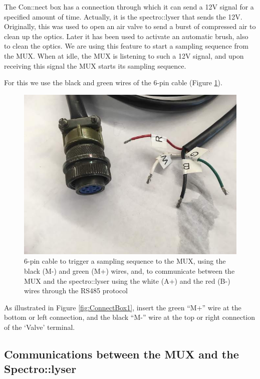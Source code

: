 \documentclass[]{book}
\begin{document}
The Con::nect box has a connection through which it can send a 12V signal for a specified amount of time. Actually, it is the spectro::lyser that sends the 12V. Originally, this was used to open an air valve to send a burst of compressed air to clean up the optics. Later it has been used to activate an automatic brush, also to clean the optics. We are using this feature to start a sampling sequence from the MUX. When at idle, the MUX is listening to such a 12V signal, and upon receiving this signal the MUX starts its sampling sequence.

For this we use the black and green wires of the 6-pin cable (Figure \ref{fig:6-pin-cable}).

\begin{figure}

{\centering \includegraphics[width=0.8\linewidth]{pictures/6-pin-cable} 

}

\caption{6-pin cable to trigger a sampling sequence to the MUX, using the black (M-) and green (M+) wires, and, to communicate between the MUX and the spectro::lyser using the white (A+) and the red (B-) wires through the RS485 protocol}\label{fig:6-pin-cable}
\end{figure}

As illustrated in Figure \ref{fig:ConnectBox1}, insert the green ``M+'' wire at the bottom or left connection, and the black ``M-'' wire at the top or right connection of the `Valve' terminal.

\hypertarget{communications-between-the-mux-and-the-spectrolyser}{%
\subsection{Communications between the MUX and the Spectro::lyser}\label{communications-between-the-mux-and-the-spectrolyser}}
\end{document}
